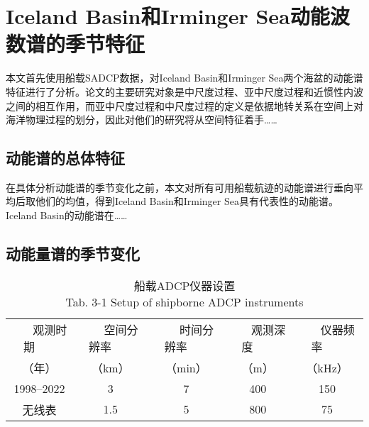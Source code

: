 \chapter{Iceland Basin和Irminger Sea动能波数谱的季节特征}

本文首先使用船载SADCP数据，对Iceland Basin和Irminger Sea两个海盆的动能谱特征进行了分析。论文的主要研究对象是中尺度过程、亚中尺度过程和近惯性内波之间的相互作用，而亚中尺度过程和中尺度过程的定义是依据地转关系在空间上对海洋物理过程的划分，因此对他们的研究将从空间特征着手……

\section{动能谱的总体特征}

在具体分析动能谱的季节变化之前，本文对所有可用船载航迹的动能谱进行垂向平均后取他们的均值，得到Iceland Basin和Irminger Sea具有代表性的动能谱。Iceland Basin的动能谱在……

\section{动能量谱的季节变化}

\begin{table}[htb]
  \centering\small
  \caption{船载ADCP仪器设置\\
  Tab. 3-1 Setup of shipborne ADCP instruments}
  \label{tab:exampletable}
  \begin{tabular}{ccccc}
    \hline\toprule
    ~~~ 观测时期 ~~~   & ~~~ 空间分辨率 ~~~  & ~~~ 时间分辨率 ~~~  & ~~~ 观测深度 ~~~ & ~~~ 仪器频率 ~~~  \\
    （年） & （km） & （min） & （m） & （kHz）  \\
    \midrule
    1998--2022 & 3 & 7 & 400 & 150 \\
    无线表 & 1.5 & 5 & 800 & 75   \\
    \bottomrule\hline
  \end{tabular}
\end{table}

